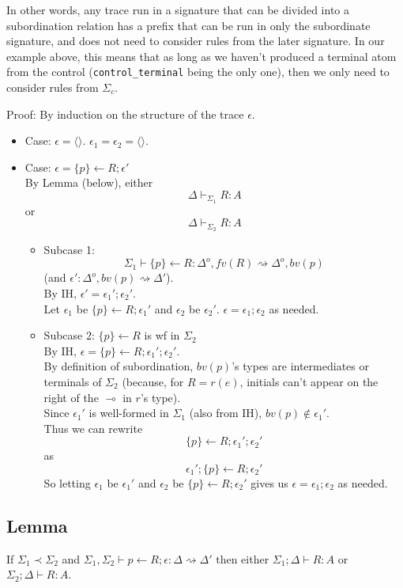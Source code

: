 \documentclass{article}
\newcommand{\lolli}{\multimap}
\newcommand{\subord}{\prec}
\newcommand{\eps}{\epsilon}
\newcommand{\stepsto}{\rightsquigarrow}
\newcommand{\nileps}{\langle\rangle}
\begin{document}
In other words, any trace run in a signature that can be divided into a
subordination relation has a prefix that can be run in only the subordinate
signature, and does not need to consider rules from the later signature. In
our example above, this means that as long as we haven't produced a
terminal atom from the control (\verb|control_terminal| being the only
one), then we only need to consider rules from $\Sigma_c$.

Proof: By induction on the structure of the trace $\eps$.

\begin{itemize}
\item Case: $\eps = \nileps$. $\eps_1 = \eps_2 = \nileps$. \checkmark
\item Case: $\eps = \{p\}\gets R; \eps'$\\
  By Lemma (below), either 
  \[ \Delta \vdash_{\Sigma_1} R : A \]
  or
  \[ \Delta \vdash_{\Sigma_2} R : A \]
  \begin{itemize}
  \item Subcase 1: 
    \[
      \Sigma_1 \vdash \{p\}\gets R 
        : \Delta^{o}, fv(R) \stepsto \Delta^{o}, bv(p)
    \]
    (and $\eps' : \Delta^o, bv(p) \stepsto \Delta'$).\\
    By IH, $\eps' = \eps_1'; \eps_2'$.\\
    Let $\eps_1$ be $\{p\} \gets R; \eps_1'$ and
    $\eps_2$ be $\eps_2'$. $\eps =\eps_1;\eps_2$ as needed.
  \item Subcase 2: $\{p\}\gets R$ is wf in $\Sigma_2$\\
    By IH, $\eps = \{p\}\gets R; \eps_1'; \eps_2'$.\\
    By definition of subordination, $bv(p)$'s types are intermediates or
    terminals of $\Sigma_2$ (because, for $R = r(e)$, initials can't appear
    on the right of the $\lolli$ in $r$'s type).\\
    Since $\eps_1'$ is well-formed in $\Sigma_1$ (also from IH),
    $bv(p) \notin \eps_1'$.\\
    Thus we can rewrite
    \[ \{p\}\gets R; \eps_1'; \eps_2' \]
    as
    \[ \eps_1'; \{p\}\gets R; \eps_2' \]
    So letting $\eps_1$ be $\eps_1'$ and $\eps_2$ be $\{p\}\gets R;
    \eps_2'$ gives us $\eps =\eps_1;\eps_2$ as needed.
  \end{itemize}
\end{itemize}

\subsection{Lemma}

If $\Sigma_1 \subord \Sigma_2$ and $\Sigma_1, \Sigma_2 \vdash p \gets
R;\eps :
\Delta \stepsto \Delta'$
then either
$\Sigma_1; \Delta \vdash R : A$
or
$\Sigma_2; \Delta \vdash R : A$.

% 
% 
\end{document}
